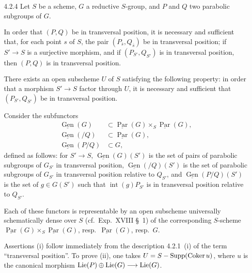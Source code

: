 \begin{corollary}{4.2.4}\label{XXVI.4.2.4}
Let $S$ be a scheme, $G$ a reductive $S$-group, and $P$ and $Q$ two parabolic subgroups of $G$.
\begin{enumeratei}
\item In order that $(P,Q)$ be in transversal position, it is necessary and sufficient that, for each point $s$ of $S$, the pair $(P_{\overline s},Q_{\overline s})$ be in transversal position; if $S'\to S$ is a surjective morphism, and if $(P_{S'},Q_{S'})$ is in transversal position, then $(P,Q)$ is in transversal position.
\item There exists an open subscheme $U$ of $S$ satisfying the following property: in order that a morphism $S'\to S$ factor through $U$, it is necessary and sufficient that $(P_{S'},Q_{S'})$ be in transversal position.
\item Consider the subfunctors
\[
\begin{aligned}
\underline{\operatorname{Gen}}(G)&\subset\underline{\operatorname{Par}}(G)\times_S\underline{\operatorname{Par}}(G),\\
\underline{\operatorname{Gen}}(/Q)&\subset\underline{\operatorname{Par}}(G),\\
\underline{\operatorname{Gen}}(P/Q)&\subset G,
\end{aligned}
\]
defined as follows: for $S'\to S$, $\underline{\operatorname{Gen}}(G)(S')$ is the set of pairs of parabolic subgroups of $G_{S'}$ in transversal position, $\underline{\operatorname{Gen}}(/Q)(S')$ is the set of parabolic subgroups of $G_{S'}$ in transversal position relative to $Q_{S'}$, and $\underline{\operatorname{Gen}}(P/Q)(S')$ is the set of $g\in G(S')$ such that $\operatorname{int}(g)P_{S'}$ is in transversal position relative to $Q_{S'}$.

Each of these functors is representable by an open subscheme universally schematically dense over $S$ (cf.~Exp.~XVIII \S~1) of the corresponding $S$-scheme $\underline{\operatorname{Par}}(G)\times_S\underline{\operatorname{Par}}(G)$, resp.~$\underline{\operatorname{Par}}(G)$, resp.~$G$.
\end{enumeratei}
\end{corollary}
Assertions (i) follow immediately from the description 4.2.1~(i) of the term ``transversal position''. To prove (ii), one takes $U=S-\operatorname{Supp}(\operatorname{Coker} u)$, where $u$ is the canonical morphism $\operatorname{Lie}(P)\oplus\operatorname{Lie}(G)\longrightarrow\operatorname{Lie}(G)$.

